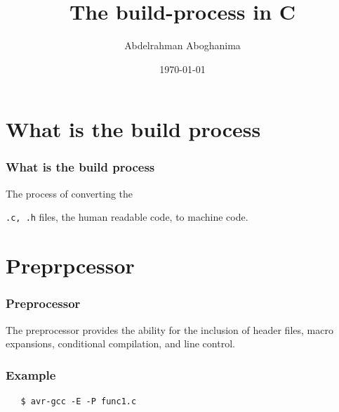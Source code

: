 \documentclass[]{beamer}
\title{The build-process in C}    %
\author{Abdelrahman Aboghanima}
\date{\today}                    %
\begin{document}
\begin{frame}
  \titlepage
\end{frame}

\section[Outline]{}

\begin{frame}
  \tableofcontents
\end{frame}





\section{What is the build process}


\begin{frame}[fragile]
  \frametitle{What is the build process}   %
  The process of converting the \item \verb|.c, .h| files, the human readable code, to machine code.
\end{frame}


\section{Preprpcessor}
\begin{frame}[fragile]
  \frametitle{Preprocessor}
  The preprocessor provides the ability for the inclusion of header files, macro expansions, conditional compilation, and line control. 
\end{frame}

\begin{frame}[fragile]
  \frametitle{Example}

 
  \begin{minipage}[t]{0.45\linewidth}
    
  \end{minipage}
  \hfill\vrule\hfill
  \begin{minipage}[t]{0.45\linewidth}
    
  \end{minipage}

 \begin{lstlisting}
   $ avr-gcc -E -P func1.c  
 \end{lstlisting}
  
\end{frame}
  
\end{document}
